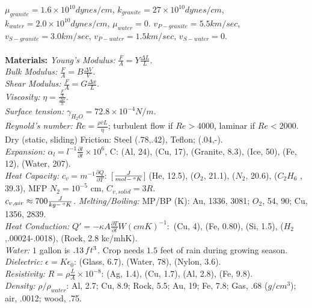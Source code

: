 $\mu_{granite}= 1.6 \times 10^{10} dynes/cm$,
$k_{granite}= 27 \times 10^{10} dynes/cm$,
$k_{water}= 2.0 \times 10^{10} dynes/cm$,
$\mu_{water}= 0$.
$v_{P-granite}= 5.5 km/sec$,
$v_{S-granite}= 3.0 km/sec$,
$v_{P-water}= 1.5 km/sec$,
$v_{S-water}= 0$.
\\
\\
{\bf Materials: }
\emph{Young's Modulus:} ${\frac F A} = Y {\frac {\Delta L} {L}}$.\\
\emph{Bulk Modulus:} ${\frac F A} = B {\frac {\Delta V} {V}}$.\\
\emph{Shear Modulus:} ${\frac F A} = G {\frac {\Delta x} {L}}$.\\
\emph{Viscosity:} $\eta = {\frac {\frac F A}  {\frac {\Delta v} {h}}}$.\\
\emph{Surface tension:} $\gamma_{H_2O}= 72.8 \times 10^{-4} N/m$.\\
\emph{Reynold's number:} $Re = {\frac {\rho {\overline v} L} {\eta}}$;
turbulent flow if $Re>4000$, laminar if $Re<2000$.\\
Dry (static, sliding) Friction:  Steel (.78,.42), Teflon; (.04,-).\\
\emph{Expansion:}
$\alpha_{l} = l^{-1} {\frac {\partial l} {\partial t}} \times 10^{6}$,
C: (Al, 24), (Cu, 17), (Granite, 8.3), (Ice, 50), (Fe, 12), (Water, 207).\\
\emph{Heat Capacity:}
$c_{v} =  m^{-1} {\frac {\partial Q } {\partial T}}:$ [${\frac {J}{mol-\thinspace^oK}}$]
(He, 12.5), ($O_{2}$, 21.1), ($N_{2}$, 20.6),
($C_{2}H_{6}$ , 39.3), MFP $N_{2}= 10^{-5}$ cm,
$C_{v,solid} = 3 R$.\\
$c_{v,air} \approx 700 {\frac {J} {kg-\thinspace^oK}}$.
\emph{Melting/Boiling:}
MP/BP (K): Au, 1336, 3081; $O_{2}$, 54, 90; Cu, 1356, 2839.\\
\emph{Heat Conduction:}
$Q' = - \kappa A  {\frac {\partial T} {\partial l}} W{(cmK)^{-1}}: $
(Cu, 4), (Fe, 0.80), (Si, 1.5), ($H_{2}$,.00024-.0018),
(Rock, 2.8 kc/mhK).\\
\emph{Water:} $1$ gallon is $.13 \thinspace ft^3$.  Crop needs $1.5$ feet of rain during growing season.
\\
\emph{Dielectric:}
$\epsilon = K \epsilon_{0}$: (Glass, 6.7), (Water, 78), (Nylon, 3.6).
\\
\emph{Resistivity:}
$R= \rho {\frac {L}{A}}  \times 10^{-8}$: (Ag, 1.4), (Cu, 1.7), (Al, 2.8),
(Fe, 9.8).
\\
\emph{Density:}
$\rho / \rho_{water}$: Al, 2.7; Cu, 8.9; Rock, 5.5; Au, 19; Fe, 7.8; Gas, .68 ($g/cm^3$);
air, .0012; wood, .75.  \\
